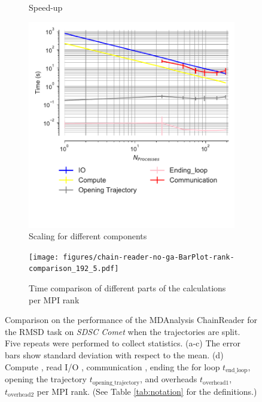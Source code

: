 \begin{figure}[!htb]
\begin{subfigure}{.4\textwidth}
  \caption{Speed-up}
  \label{fig:MPIspeedup-chain-reader}
\end{subfigure}
\bigskip
\begin{subfigure}{.45\textwidth}
  \includegraphics[width=\linewidth]{figures/IO_compute_scaling_traj_splitting-chain-reader.pdf}
  \captionsetup{format=hang}
  \caption{Scaling for different components}
  \label{fig:MPIscaling-chain-reader}
\end{subfigure}
\hfill
\begin{subfigure}{.5\textwidth}
  \texttt{[image: figures/chain-reader-no-ga-BarPlot-rank-comparison\_192\_5.pdf]}
  \captionsetup{format=hang}
  \caption{Time comparison of different parts of the calculations per MPI rank}
  \label{fig:MPIranks-split-chain-reader}
\end{subfigure}

\caption{Comparison on the performance of the MDAnalysis ChainReader for the RMSD task on \emph{SDSC Comet} when the trajectories are split.
Five repeats were performed to collect statistics.
(a-c) The error bars show standard deviation with respect to the mean.
(d) Compute \tcomp, read I/O \tIO, communication \tcomm, ending the for loop $t_{\text{end\_loop}}$,  opening the trajectory $t_{\text{opening\_trajectory}}$, and overheads $t_{\text{overhead1}}$, $t_{\text{overhead2}}$ per MPI rank. (See Table \ref{tab:notation} for the definitions.)}
\label{fig:MPIwithIO-split-chain-reader}
\end{figure}

